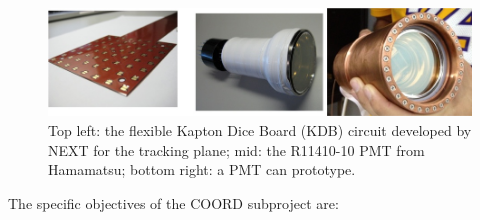 \begin{figure}[t!b!]
\begin{center}
\includegraphics[width=.9\textwidth]{img/KDBandPMT.jpg}
\end{center}
\caption{Top left: the flexible Kapton Dice Board (KDB) circuit developed by NEXT for the tracking plane; mid: the R11410-10 PMT from Hamamatsu; bottom right: a PMT can prototype.} \label{fig:sensors}
\end{figure}

The specific objectives of the COORD subproject are:

